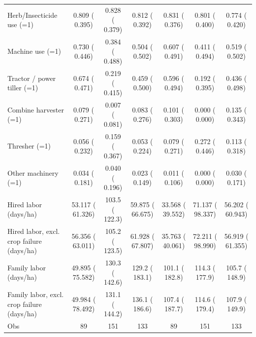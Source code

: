 \begin{tabular}{lcccccc}
Herb/Insecticide use (=1) &     0.809 (    0.395) &     0.828 (    0.379) &     0.812 (    0.392) &     0.831 (    0.376) &     0.801 (    0.400) &     0.774 (    0.420) \\
Machine use (=1) &     0.730 (    0.446) &     0.384 (    0.488) &     0.504 (    0.502) &     0.607 (    0.491) &     0.411 (    0.494) &     0.519 (    0.502) \\
\quad Tractor / power tiller (=1) &     0.674 (    0.471) &     0.219 (    0.415) &     0.459 (    0.500) &     0.596 (    0.494) &     0.192 (    0.395) &     0.436 (    0.498) \\
\quad Combine harvester (=1) &     0.079 (    0.271) &     0.007 (    0.081) &     0.083 (    0.276) &     0.101 (    0.303) &     0.000 (    0.000) &     0.135 (    0.343) \\
\quad Thresher (=1) &     0.056 (    0.232) &     0.159 (    0.367) &     0.053 (    0.224) &     0.079 (    0.271) &     0.272 (    0.446)\sym{**} &     0.113 (    0.318) \\
\quad Other machinery (=1) &     0.034 (    0.181) &     0.040 (    0.196) &     0.023 (    0.149) &     0.011 (    0.106) &     0.000 (    0.000) &     0.030 (    0.171) \\
Hired labor (days/ha) &    53.117 (   61.326) &        103.5 (       122.3)\sym{*} &    59.875 (   66.675) &    33.568 (   39.552) &    71.137 (   98.337)\sym{***} &    56.202 (   60.943)\sym{***} \\
\quad Hired labor, excl. crop failure (days/ha) &    56.356 (   63.011) &        105.2 (       123.5)\sym{*} &    61.928 (   67.807) &    35.763 (   40.061) &    72.211 (   98.990)\sym{***} &    56.919 (   61.355)\sym{***} \\
Family labor (days/ha) &    49.895 (   75.582) &        130.3 (       142.6)\sym{**} &        129.2 (       183.1) &        101.1 (       182.8) &        114.3 (       177.9) &        105.7 (       148.9) \\
\quad Family labor, excl. crop failure (days/ha) &    49.984 (   78.492) &        131.1 (       144.2)\sym{**} &        136.1 (       186.6)\sym{*} &        107.4 (       187.7) &        114.6 (       179.4) &        107.9 (       149.9) \\
\midrule
Obs &        89 &       151 &       133 &        89 &       151 &       133 \\
\bottomrule
\end{tabular}
